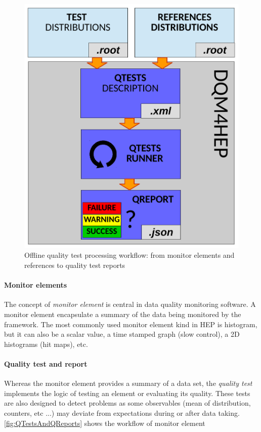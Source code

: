 \documentclass{webofc}
\begin{document}
{ %

\begin{figure}
    \includegraphics[width=\linewidth]{figs/QTestRunner.pdf}
    \caption{Offline quality test processing workflow: from monitor elements and references to quality test reports}
    \label{fig:QTestsAndQReports}
\end{figure} 

\paragraph{Monitor elements}

The concept of \textit{monitor element} is central in data quality monitoring software.
A monitor element encapsulate a summary of the data being monitored by the framework.
The most commonly used monitor element kind in HEP is histogram, but it can also be a scalar value, a time stamped graph 
(slow control), a 2D histograms (hit maps), etc. 

\paragraph{Quality test and report}

Whereas the monitor element provides a summary of a data set, the \textit{quality test} implements the logic of testing 
an element or evaluating its quality. These tests are also designed to detect problems as some observables (mean of 
distribution, counters, etc ...) may deviate from expectations during or after data taking. \autoref{fig:QTestsAndQReports} 
shows the workflow of monitor element 

} %
\end{document}
